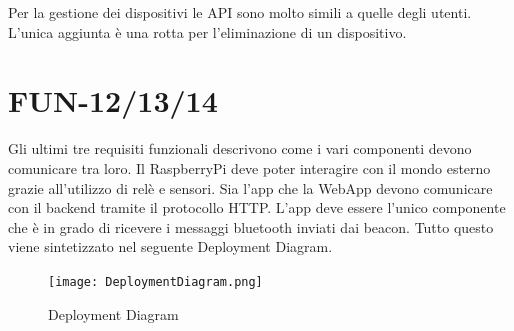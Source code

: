 Per la gestione dei dispositivi le API sono molto simili a quelle degli utenti.
L'unica aggiunta è una rotta per l'eliminazione di un dispositivo.

\section{FUN-12/13/14}
Gli ultimi tre requisiti funzionali descrivono come i vari componenti devono comunicare tra loro.
Il RaspberryPi deve poter interagire con il mondo esterno grazie all'utilizzo di relè e sensori.
Sia l'app che la WebApp devono comunicare con il backend tramite il protocollo HTTP.
L'app deve essere l'unico componente che è in grado di ricevere i messaggi bluetooth inviati dai beacon.
Tutto questo viene sintetizzato nel seguente Deployment Diagram.
\begin{figure}[h]
\centering
\texttt{[image: DeploymentDiagram.png]} 
\caption{Deployment Diagram}
\label{fig:deployment}
\end{figure}